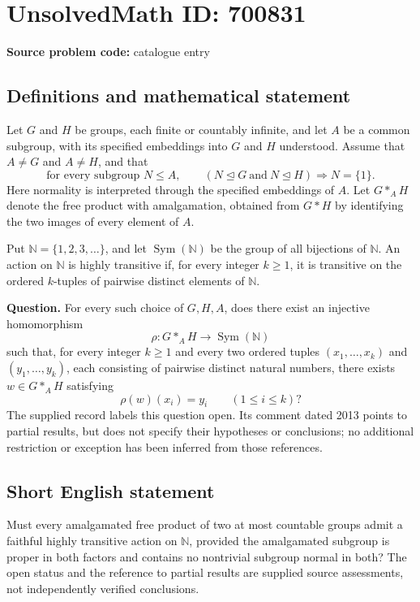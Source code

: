 \documentclass[11pt]{article}
\begin{document}
\section*{UnsolvedMath ID: 700831}
\textbf{Source problem code:} catalogue entry
\subsection{Definitions and mathematical statement}
Let \(G\) and \(H\) be groups, each finite or countably infinite, and let \(A\) be a common subgroup, with its specified embeddings into \(G\) and \(H\) understood. Assume that \(A\neq G\) and \(A\neq H\), and that
\[
\text{for every subgroup }N\leq A,\qquad
(N\trianglelefteq G\ \text{and}\ N\trianglelefteq H)\Longrightarrow N=\{1\}.
\]
Here normality is interpreted through the specified embeddings of \(A\). Let \(G*_A H\) denote the free product with amalgamation, obtained from \(G*H\) by identifying the two images of every element of \(A\).

Put \(\mathbb N=\{1,2,3,\ldots\}\), and let \(\operatorname{Sym}(\mathbb N)\) be the group of all bijections of \(\mathbb N\). An action on \(\mathbb N\) is highly transitive if, for every integer \(k\geq1\), it is transitive on the ordered \(k\)-tuples of pairwise distinct elements of \(\mathbb N\).

\textbf{Question.} For every such choice of \(G,H,A\), does there exist an injective homomorphism
\[
\rho:G*_A H\longrightarrow\operatorname{Sym}(\mathbb N)
\]
such that, for every integer \(k\geq1\) and every two ordered tuples \((x_1,\ldots,x_k)\) and \((y_1,\ldots,y_k)\), each consisting of pairwise distinct natural numbers, there exists \(w\in G*_A H\) satisfying
\[
\rho(w)(x_i)=y_i\qquad(1\leq i\leq k)?
\]
The supplied record labels this question open. Its comment dated 2013 points to partial results, but does not specify their hypotheses or conclusions; no additional restriction or exception has been inferred from those references.
\subsection{Short English statement}
Must every amalgamated free product of two at most countable groups admit a faithful highly transitive action on \(\mathbb N\), provided the amalgamated subgroup is proper in both factors and contains no nontrivial subgroup normal in both? The open status and the reference to partial results are supplied source assessments, not independently verified conclusions.
\end{document}
